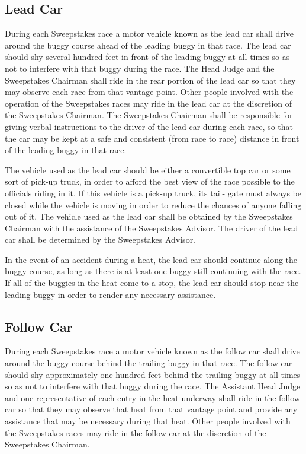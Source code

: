 \documentclass[openany]{book}
\begin{document}
\subsection{Lead Car}

During each Sweepstakes race a motor vehicle known as the lead car shall drive around the buggy course ahead of the leading buggy in that race. The lead car should shy several hundred feet in front of the leading buggy at all times so as not to interfere with that buggy during the race. The Head Judge and the Sweepstakes Chairman shall ride in the rear portion of the lead car so that they may observe each race from that vantage point. Other people involved with the operation of the Sweepstakes races may ride in the lead car at the discretion of the Sweepstakes Chairman. The Sweepstakes Chairman shall be responsible for giving verbal instructions to the driver of the lead car during each race, so that the car may be kept at a safe and consistent (from race to race) distance in front of the leading buggy in that race.

The vehicle used as the lead car should be either a convertible top car or some sort of pick-up truck, in order to afford the best view of the race possible to the officials riding in it. If this vehicle is a pick-up truck, its tail- gate must always be closed while the vehicle is moving in order to reduce the chances of anyone falling out of it. The vehicle used as the lead car shall be obtained by the Sweepstakes Chairman with the assistance of the Sweepstakes Advisor. The driver of the lead car shall be determined by the Sweepstakes Advisor.

In the event of an accident during a heat, the lead car should continue along the buggy course, as long as there is at least one buggy still continuing with the race. If all of the buggies in the heat come to a stop, the lead car should stop near the leading buggy in order to render any necessary assistance.

\subsection{Follow Car}

During each Sweepstakes race a motor vehicle known as the follow car shall drive around the buggy course behind the trailing buggy in that race. The follow car should shy approximately one hundred feet behind the trailing buggy at all times so as not to interfere with that buggy during the race. The Assistant Head Judge and one representative of each entry in the heat underway shall ride in the follow car so that they may observe that heat from that vantage point and provide any assistance that may be necessary during that heat. Other people involved with the Sweepstakes races may ride in the follow car at the discretion of the Sweepstakes Chairman.
\end{document}
